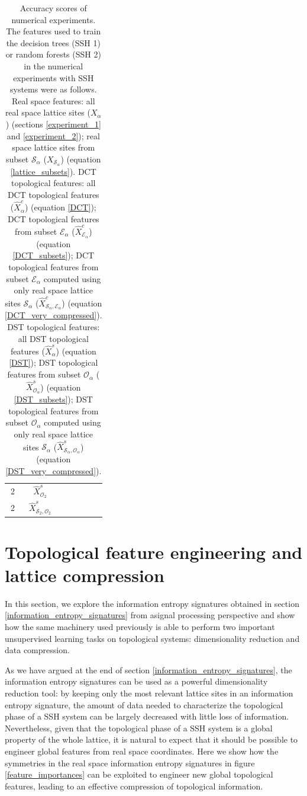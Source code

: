 \documentclass[10pt]{revtex4-1}
\newcommand\accPrec{4}  %
\newcommand{\tableRow}[1]{\\[#1 cm]}
\newcommand\tableRowEnd{\tableRow{0.15}}
\newcommand\xsOTwo{$\hat{X}^s_{\mathcal{O}_2}$}
\newcommand\xsOTwoEigVal{\fpeval{round(0.9042001086956524,\accPrec)}}
\newcommand\xsOTwoEigTest{\fpeval{round(0.552662980209546,\accPrec)}}
\newcommand\xsOTwoHamVal{\fpeval{round(0.9917789855072465,\accPrec)}}
\newcommand\xsOTwoHamTest{\fpeval{round(0.7427124563445866,\accPrec)}}
\newcommand\xsSOTwo{$\hat{X}^s_{\mathcal{S}_2,\mathcal{O}_2}$}
\newcommand\xsSOTwoEigVal{\fpeval{round(0.8203919927536232,\accPrec)}}
\newcommand\xsSOTwoEigTest{\fpeval{round(0.41268987194412105,\accPrec)}}
\newcommand\xsSOTwoHamVal{\fpeval{round(0.9941884057971013,\accPrec)}}
\newcommand\xsSOTwoHamTest{\fpeval{round(0.5903026775320139,\accPrec)}}
\newcommand\xalpha{$X_\alpha$}
\newcommand\xSalpha{$X_{\mathcal{S}_\alpha}$}
\newcommand\xcalpha{$\hat{X}^c_\alpha$}
\newcommand\xcEalpha{$\hat{X}^c_{\mathcal{E}_\alpha}$}
\newcommand\xcSEalpha{$\hat{X}^c_{\mathcal{S}_\alpha,\mathcal{E}_\alpha}$}
\newcommand\xsalpha{$\hat{X}^s_\alpha$}
\newcommand\xsOalpha{$\hat{X}^s_{\mathcal{O}_\alpha}$}
\newcommand\xsSOalpha{$\hat{X}^s_{\mathcal{S}_\alpha,\mathcal{O}_\alpha}$}
\begin{document}
\begin{table}
\begin{tabular}{||c@{\hskip 0.3in} c@{\hskip 0.3in} c@{\hskip 0.3in} c@{\hskip 0.3in} c@{\hskip 0.3in} c||}
2                     &\xsOTwo           &\xsOTwoEigVal      &\xsOTwoEigTest     &\xsOTwoHamVal        &\xsOTwoHamTest     \tableRowEnd
2                     &\xsSOTwo          &\xsSOTwoEigVal     &\xsSOTwoEigTest    &\xsSOTwoHamVal       &\xsSOTwoHamTest    \tableRowEnd
\bottomrule
\end{tabular}
\caption{\label{accuracy_scores}Accuracy scores of numerical experiments. The features used to train the decision trees (SSH 1) or random forests (SSH 2) in the numerical experiments with SSH systems were as follows. Real space features: all real space lattice sites (\xalpha) (sections \ref{experiment_1} and \ref{experiment_2}); real space lattice sites from subset $\mathcal{S}_{\alpha}$ (\xSalpha) (equation \eqref{lattice_subsets}). DCT topological features: all DCT topological features (\xcalpha) (equation \eqref{DCT}); DCT topological features from subset $\mathcal{E}_\alpha$ (\xcEalpha) (equation \eqref{DCT_subsets}); DCT topological features from subset $\mathcal{E}_\alpha$ computed using only real space lattice sites $\mathcal{S}_{\alpha}$ (\xcSEalpha) (equation \eqref{DCT_very_compressed}). DST topological features: all DST topological features (\xsalpha) (equation \eqref{DST}); DST topological features from subset $\mathcal{O}_\alpha$ (\xsOalpha) (equation \eqref{DST_subsets}); DST topological features from subset $\mathcal{O}_\alpha$ computed using only real space lattice sites $\mathcal{S}_{\alpha}$ (\xsSOalpha) (equation \eqref{DST_very_compressed}). }
\end{table}




\section{Topological feature engineering and lattice compression}
\label{topological_feature_engineering}

In this section, we explore the information entropy signatures obtained in section \ref{information_entropy_signatures} from asignal processing perspective and show how the same machinery used previously is able to perform two important unsupervised learning tasks on topological systems: dimensionality reduction and data compression. 

As we have argued at the end of section \ref{information_entropy_signatures}, the information entropy signatures can be used as a powerful dimensionality reduction tool: by keeping only the most relevant lattice sites in an information entropy signature, the amount of data needed to characterize the topological phase of a SSH system can be largely decreased with little loss of information. Nevertheless, given that the topological phase of a SSH system is a global property of the whole lattice, it is natural to expect that it should be possible to engineer global features from real space coordinates. Here we show how the symmetries in the real space information entropy signatures in figure \ref{feature_importances} can be exploited to engineer new global topological features, leading to an effective compression of topological information.
\end{document}
